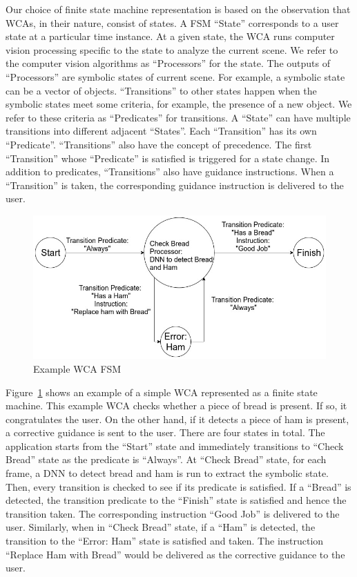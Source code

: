Our choice of finite state machine representation is based on the observation
that WCAs, in their nature, consist of states. A FSM ``State'' corresponds to a
user state at a particular time instance. At a given state, the WCA runs
computer vision processing specific to the state to analyze the current scene.
We refer to the computer vision algorithms as ``Processors'' for the state. The
outputs of ``Processors'' are symbolic states of current scene. For example, a
symbolic state can be a vector of objects. ``Transitions'' to other states
happen when the symbolic states meet some criteria, for example, the presence of
a new object. We refer to these criteria as ``Predicates'' for transitions. A
``State'' can have multiple transitions into different adjacent ``States''. Each
``Transition'' has its own ``Predicate''. ``Transitions'' also have the concept
of precedence. The first ``Transition'' whose ``Predicate'' is satisfied is
triggered for a state change. In addition to predicates, ``Transitions'' also
have guidance instructions. When a ``Transition'' is taken, the corresponding
guidance instruction is delivered to the user.


\begin{figure}
  \centering
  \includegraphics[trim={0 0 0 0},width=\linewidth]{FIGS/fsm-example}
	\caption{Example WCA FSM}
    \label{figs:fsm-example}
\end{figure}

Figure~\ref{figs:fsm-example} shows an example of a simple WCA represented as a
finite state machine. This example WCA checks whether a piece of bread is
present. If so, it congratulates the user. On the other hand, if it detects a
piece of ham is present, a corrective guidance is sent to the user. There are
four states in total. The application starts from the ``Start'' state and
immediately transitions to ``Check Bread'' state as the predicate is ``Always''.
At ``Check Bread'' state, for each frame, a DNN to detect bread and ham is run
to extract the symbolic state. Then, every transition is checked to see if its
predicate is satisfied. If a ``Bread'' is detected, the transition predicate to
the ``Finish'' state is satisfied and hence the transition taken. The
corresponding instruction ``Good Job'' is delivered to the user. Similarly, when
in ``Check Bread'' state, if a ``Ham'' is detected, the transition to the
``Error: Ham'' state is satisfied and taken. The instruction ``Replace Ham with
Bread'' would be delivered as the corrective guidance to the user.

